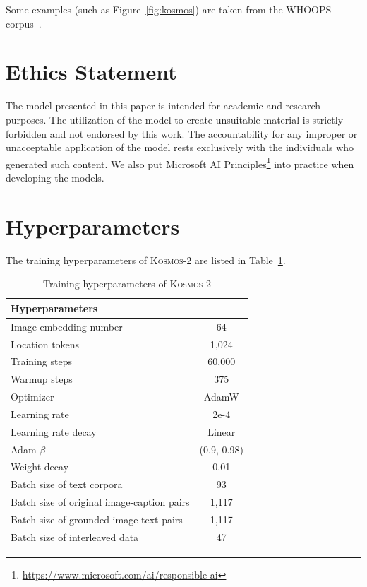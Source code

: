 \documentclass{article}
\newcommand\our{\textsc{Kosmos-2}}
\begin{document}
Some examples (such as Figure~\ref{fig:kosmos}) are taken from the WHOOPS corpus~\cite{whoops}.


\section*{Ethics Statement}

The model presented in this paper is intended for academic and research purposes.
The utilization of the model to create unsuitable material is strictly forbidden and not endorsed by this work.
The accountability for any improper or unacceptable application of the model rests exclusively with the individuals who generated such content.
We also put Microsoft AI Principles\footnote{\url{https://www.microsoft.com/ai/responsible-ai}} into practice when developing the models.





\nocite{cm3}
\nocite{blip2}

\newpage
\appendix

\section{Hyperparameters}
\label{app:hyperparam}


The training hyperparameters of \our{} are listed in Table~\ref{tbl:hyperparam:vl:pt:opt}.


\begin{table}[ht]
\centering
\small
\begin{tabular}{lc}
\toprule
\textbf{Hyperparameters} & \\ \midrule
Image embedding number & 64 \\
Location tokens & 1,024 \\
\midrule
Training steps   &       60,000 \\
Warmup steps     &       375 \\
Optimizer & AdamW \\
Learning rate & 2e-4 \\
Learning rate decay & Linear \\
Adam $\beta$ & (0.9, 0.98) \\
Weight decay & 0.01 \\
\midrule
Batch size of text corpora         &      93  \\
Batch size of original image-caption pairs  & 1,117 \\
Batch size of grounded image-text pairs  & 1,117 \\
Batch size of interleaved data   &    47    \\
\bottomrule
\end{tabular}
\vspace{0.2cm}
\caption{Training hyperparameters of \our{}}
\label{tbl:hyperparam:vl:pt:opt}
\end{table}
\end{document}
